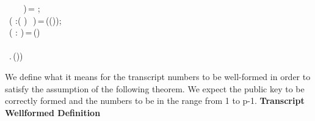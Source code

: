 \begin{holmath}
\,\,\,\,\,\,\,\,\,\,\,\,\,)\,=\,\,;\\
\,\,\,( :(\,\HOLTokenProd{}\,)\,\HOLTokenProd{}\,\,\HOLTokenProd{}\,)\,=\,((\HOLSymConst{,})\HOLSymConst{,}\HOLBoundVar{\ensuremath{\alpha}}\HOLSymConst{,});\\
\,\,\,( :\,\HOLTokenProd{}\,)\,=\,(\HOLSymConst{,})\\
\,\\
\,\,\,.\,(\HOLSymConst{,}\HOLSymConst{,}\HOLSymConst{,}))
\end{holmath}  
We define what it means for the transcript numbers to be well-formed in 
order to satisfy the assumption of the following theorem. We expect the 
public key to be correctly formed and the numbers to be in the range from 1 to p-1.
\textbf{Transcript Wellformed Definition}
